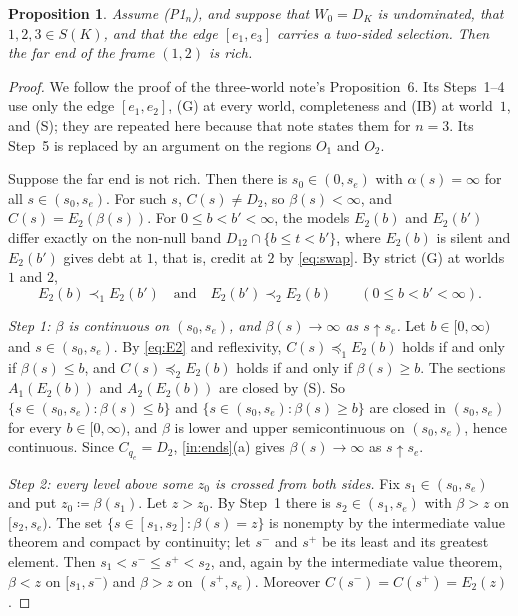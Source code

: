 \documentclass[11pt]{article}
\newtheorem{proposition}[theorem]{Proposition}
\theoremstyle{definition}\newtheorem{definition}[theorem]{Definition}
\theoremstyle{remark}\newtheorem{remark}[theorem]{Remark}
\begin{document}
\begin{proposition}\label{prop:rich}
Assume (P1$_n$), and suppose that $W_0=D_K$ is undominated, that
$1,2,3\in S(K)$, and that the edge $[e_1,e_3]$ carries a two-sided
selection. Then the far end of the frame $(1,2)$ is rich.
\end{proposition}
\begin{proof}
We follow the proof of the three-world note's Proposition~6. Its
Steps~1--4 use only the edge $[e_1,e_2]$, (G) at every world, completeness
and (IB) at world~$1$, and (S); they are repeated here because that note
states them for $n=3$. Its Step~5 is replaced by an argument on the regions
$O_1$ and $O_2$.

Suppose the far end is not rich. Then there is $s_0\in(0,s_e)$ with
$\alpha(s)=\infty$ for all $s\in(s_0,s_e)$. For such $s$, $C(s)\ne D_2$, so
$\beta(s)<\infty$, and $C(s)=E_2(\beta(s))$. For $0\le b<b'<\infty$, the
models $E_2(b)$ and $E_2(b')$ differ exactly on the non-null band
$D_{12}\cap\{b\le t<b'\}$, where $E_2(b)$ is silent and $E_2(b')$ gives
debt at $1$, that is, credit at $2$ by \eqref{eq:swap}. By strict (G) at
worlds $1$ and $2$,
\begin{equation}
 E_2(b)\prec_1E_2(b')\quad\text{and}\quad E_2(b')\prec_2E_2(b)
 \qquad(0\le b<b'<\infty).
 \label{eq:E2}
\end{equation}

\emph{Step 1: $\beta$ is continuous on $(s_0,s_e)$, and $\beta(s)\to\infty$
as $s\uparrow s_e$.} Let $b\in[0,\infty)$ and $s\in(s_0,s_e)$. By
\eqref{eq:E2} and reflexivity, $C(s)\preceq_1E_2(b)$ holds if and only if
$\beta(s)\le b$, and $C(s)\preceq_2E_2(b)$ holds if and only if
$\beta(s)\ge b$. The sections $A_1(E_2(b))$ and $A_2(E_2(b))$ are closed by
(S). So $\{s\in(s_0,s_e):\beta(s)\le b\}$ and
$\{s\in(s_0,s_e):\beta(s)\ge b\}$ are closed in $(s_0,s_e)$ for every
$b\in[0,\infty)$, and $\beta$ is lower and upper semicontinuous on
$(s_0,s_e)$, hence continuous. Since $C_{q_e}=D_2$, \ref{in:ends}(a) gives
$\beta(s)\to\infty$ as $s\uparrow s_e$.

\emph{Step 2: every level above some $z_0$ is crossed from both sides.} Fix
$s_1\in(s_0,s_e)$ and put $z_0\coloneqq\beta(s_1)$. Let $z>z_0$. By Step~1
there is $s_2\in(s_1,s_e)$ with $\beta>z$ on $[s_2,s_e)$. The set
$\{s\in[s_1,s_2]:\beta(s)=z\}$ is nonempty by the intermediate value
theorem and compact by continuity; let $s^-$ and $s^+$ be its least and its
greatest element. Then $s_1<s^-\le s^+<s_2$, and, again by the intermediate
value theorem, $\beta<z$ on $[s_1,s^-)$ and $\beta>z$ on $(s^+,s_e)$.
Moreover $C(s^-)=C(s^+)=E_2(z)$.


\end{proof}
\end{document}
